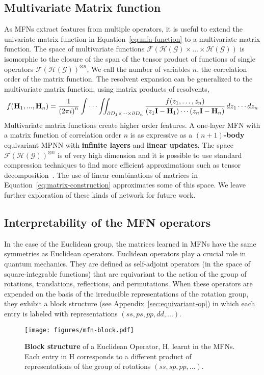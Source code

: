\documentclass{article} \usepackage{iclr2024_conference,times}
\begin{document}
\subsection{Multivariate Matrix function}
\label{sec:multivariate}
As MFNs extract features from multiple operators, it is useful to extend the univariate matrix function in Equation~\ref{eq:mfn-function} to a multivariate matrix function. The space of multivariate functions $\mathcal{F}(\mathcal{H}(\mathcal{G}) \times ... \times \mathcal{H}(\mathcal{G}))$ is isomorphic to the closure of the span of the tensor product of functions of single operators $\mathcal{F}(\mathcal{H}(\mathcal{G}))^{\otimes n}$,
We call the number of variables $n$, the correlation order of the matrix function. The resolvent expansion can be generalized to the multivariate matrix function, using matrix products of resolvents,
\begin{equation}
    f({\bf H}_{1}, ..., {\bf H}_{n})={\frac {1}{\left(2\pi i\right)^{n}}}\int \cdots \iint _{\partial D_{1}\times \cdots \times \partial D_{n}}{\frac {f(z_{1},\ldots ,z_{n})}{(z_{1}{\bf I}- {\bf H}_{1})\cdots (z_{n}{\bf I} - {\bf H}_{n})}}\,dz_{1}\cdots dz_{n}
\end{equation}
Multivariate matrix functions create higher order features. A one-layer MFN with a matrix function of correlation order $n$ is as expressive as a \textbf{$(n + 1)$-body} equivariant MPNN with \textbf{infinite layers} and \textbf{linear updates}.
The space $\mathcal{F}(\mathcal{H}(\mathcal{G}))^{\otimes n}$ is of very high dimension and it is possible to use standard compression techniques to find more efficient approximations such as tensor decomposition~\citep{TraceDarby2023}.
The use of linear combinations of matrices in Equation~\ref{eq:matrix-construction} approximates some of this space.
We leave further exploration of these kinds of network for future work.

\vspace{-8pt}
\subsection{Interpretability of the MFN operators}
\vspace{-6pt}
In the case of the Euclidean group, the matrices learned in MFNs have the same symmetries as Euclidean operators.
Euclidean operators play a crucial role in quantum mechanics. They are defined as self-adjoint operators (in the space of square-integrable functions) that are equivariant to the action of the group of rotations, translations, reflections, and permutations. When these operators are expended on the basis of the irreducible representations of the rotation group, they exhibit a block structure (see Appendix~\ref{sec:equivariant-op}) in which each entry is labeled with representations $(ss, ps, pp, dd,...)$. 
\begin{figure}[h!]
    \centering
\texttt{[image: figures/mfn-block.pdf]}
    \caption{\textbf{Block structure} of a Euclidean Operator, H, learnt in the MFNs. Each entry in H corresponds to a different product of representations of the group of rotations  $(ss, sp, pp,...)$.}
    \label{fig:enter-label}
\end{figure}
\end{document}
